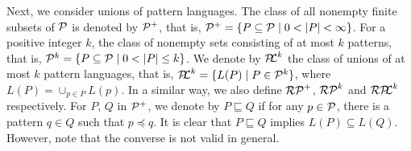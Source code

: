 Next, we consider unions of pattern languages. %
The class of all nonempty finite subsets of $\mathcal{P}$ is denoted by $\mathcal{P}^{+}$, that is,
$\mathcal{P}^{+} = \{P \subseteq \mathcal{P} \mid 0 < |P| < \infty\}$.
For a positive integer $k$, the class of nonempty sets consisting of at most $k$ patterns, that is,
$\mathcal{P}^{k} = \{P \subseteq \mathcal{P} \mid 0 < |P| \leq k\}$.
We denote by $\mathcal{P\!\!L}^{k}$ the class of unions of at most $k$ pattern languages,
that is, $\mathcal{P\!\!L}^{k} = \{L(P) \mid P \in \mathcal{P}^{k}\}$,
where $L(P) = \cup_{p \in P}L(p)$.
In a similar way, we also define $\mathcal{RP}^{+}$, $\mathcal{RP}^{k}$ and $\mathcal{RP\!\!L}^{k}$ respectively.
%
For $P$, $Q$ in $\mathcal{P}^{+}$,
we denote by $P \sqsubseteq Q$ if for any $p \in \mathcal{P}$, there is a pattern $q \in Q$ such that $p \preceq q$.
It is clear that $P \sqsubseteq Q$ implies $L(P) \subseteq L(Q)$.
However, note that the converse is not valid in general.

